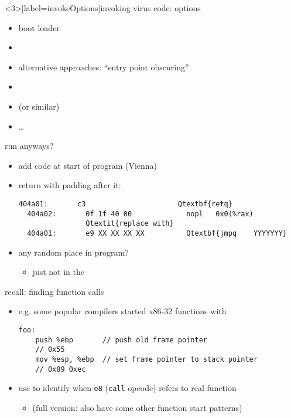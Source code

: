 \begin{frame}<3>[label=invokeOptions]{invoking virus code: options}
    \begin{itemize}
    \item boot loader
    \item {} 
    \item alternative approaches: ``entry point obscuring''
    \item {}
    \item {} (or similar)
    \item \ldots
    \end{itemize}
\end{frame}

\begin{frame}[fragile,label=runAnyways]{run anyways?}
    \begin{itemize}
    \item add code at start of program (Vienna)
    \item return with padding after it:
\begin{Verbatim}[fontsize=\fontsize{10}{11}\selectfont,commandchars=Q\{\}]
  404a01:       c3                      Qtextbf{retq}
  404a02:       0f 1f 40 00             nopl   0x0(%rax)
                Qtextit{replace with}
  404a01:       e9 XX XX XX XX          Qtextbf{jmpq    YYYYYYY}
\end{Verbatim}
    \item any random place in program?
        \begin{itemize}
        \item just not in the 
        \end{itemize}
    \end{itemize}
\end{frame}

\begin{frame}[fragile,label=findValidFindFunc2]{recall: finding function calls}
\lstset{language=myasm,style=small}
    \begin{itemize}
    \item e.g. some popular compilers started x86-32 functions with
\begin{lstlisting}
foo:
    push %ebp       // push old frame pointer
    // 0x55
    mov %esp, %ebp  // set frame pointer to stack pointer
    // 0x89 0xec
\end{lstlisting}
    \item use to identify when {\tt e8} ({\tt call} opcode) refers to real function
    \begin{itemize}
    \item (full version: also have some other function start patterns)
    \end{itemize}
    \end{itemize}
\end{frame}



